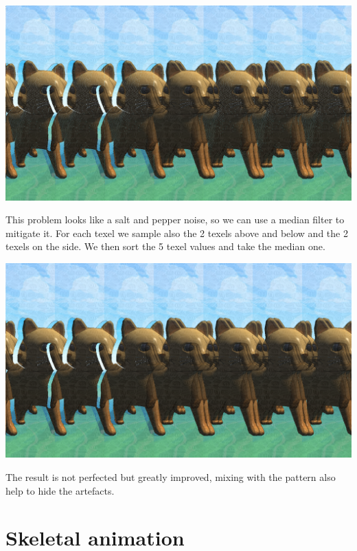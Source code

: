 \documentclass[12pt, a4paper]{article}
\begin{document}
\begin{center}
    \centering
    \includegraphics[width=1.0\textwidth]{img/error.png}
\end{center}

This problem looks like a salt and pepper noise, so we can use a median filter to mitigate it. For each texel
we sample also the 2 texels above and below and the 2 texels on the side. We then sort the 5 texel values and take
the median one.

\begin{center}
    \centering
    \includegraphics[width=1.0\textwidth]{img/fix.png}
\end{center}
The result is not perfected but greatly improved, mixing with the pattern also help to hide the artefacts.

\section{Skeletal animation}
\end{document}
